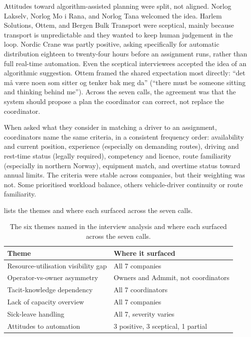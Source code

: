 Attitudes toward algorithm-assisted planning were split, not aligned. Norlog Lakselv, Norlog Mo i Rana, and Norlog Tana welcomed the idea. Harlem Solutions, Ottem, and Bergen Bulk Transport were sceptical, mainly because transport is unpredictable and they wanted to keep human judgement in the loop. Nordic Crane was partly positive, asking specifically for automatic distribution eighteen to twenty-four hours before an assignment runs, rather than full real-time automation. Even the sceptical interviewees accepted the idea of an algorithmic suggestion. Ottem framed the shared expectation most directly: ``det må være noen som sitter og tenker bak meg da'' (``there must be someone sitting and thinking behind me''). Across the seven calls, the agreement was that the system should propose a plan the coordinator can correct, not replace the coordinator.

When asked what they consider in matching a driver to an assignment, coordinators name the same criteria, in a consistent frequency order: availability and current position, experience (especially on demanding routes), driving and rest-time status (legally required), competency and licence, route familiarity (especially in northern Norway), equipment match, and overtime status toward annual limits. The criteria were stable across companies, but their weighting was not. Some prioritised workload balance, others vehicle-driver continuity or route familiarity.

 lists the themes and where each surfaced across the seven calls.

\begin{table}[h]
\centering
\caption{The six themes named in the interview analysis and where each surfaced across the seven calls.}
\label{tab:themes}
\small
\begin{tabular}{p{}p{}}
\toprule
\textbf{Theme} & \textbf{Where it surfaced} \\
\midrule
Resource-utilisation visibility gap & All 7 companies \\
Operator-vs-owner asymmetry        & Owners and Admmit, not coordinators \\
Tacit-knowledge dependency         & All 7 coordinators \\
Lack of capacity overview          & All 7 companies \\
Sick-leave handling                & All 7, severity varies \\
Attitudes to automation            & 3 positive, 3 sceptical, 1 partial \\
\bottomrule
\end{tabular}
\end{table}

